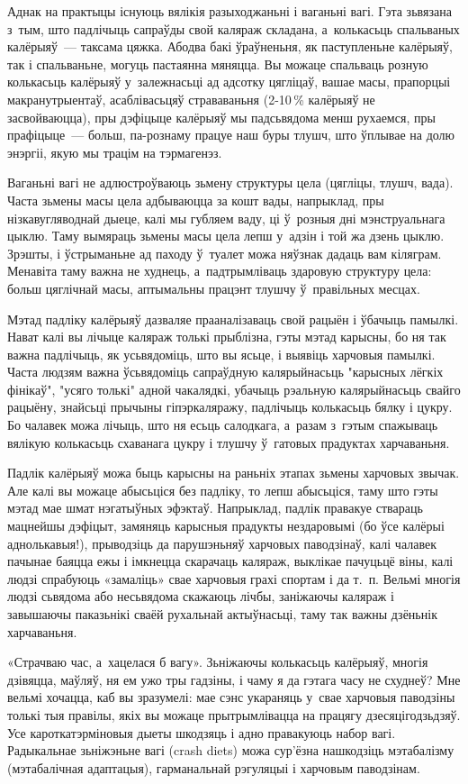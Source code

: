 Аднак на практыцы існуюць вялікія разыходжаньні і ваганьні вагі. Гэта зьвязана з~тым, што падлічыць сапраўды свой каляраж складана, а~колькасьць спальваных калёрыяў~--- таксама цяжка. Абодва бакі ўраўненьня, як паступленьне калёрыяў, так і спальваньне, могуць пастаянна мяняцца. Вы можаце спальваць розную колькасьць калёрыяў у~залежнасьці ад адсотку цягліцаў, вашае масы, прапорцыі макранутрыентаў, асаблівасьцяў страваваньня (2-10\,\% калёрыяў не засвойваюцца), пры дэфіцыце калёрыяў мы падсьвядома менш рухаемся, пры прафіцыце~--- больш, па-рознаму працуе наш буры тлушч, што ўплывае на долю энэргіі, якую мы трацім на тэрмагенэз.

Ваганьні вагі не адлюстроўваюць зьмену структуры цела (цягліцы, тлушч, вада). Часта зьмены масы цела адбываюцца за кошт вады, напрыклад, пры нізкавугляводнай дыеце, калі мы губляем ваду, ці ў~розныя дні мэнструальнага цыклю. Таму вымяраць зьмены масы цела лепш у~адзін і той жа дзень цыклю. Зрэшты, і ўстрыманьне ад паходу ў~туалет можа няўзнак дадаць вам кіляграм. Менавіта таму важна не худнець, а~падтрымліваць здаровую структуру цела: больш цяглічнай масы, аптымальны працэнт тлушчу ў~правільных месцах.

Мэтад падліку калёрыяў дазваляе прааналізаваць свой рацыён і ўбачыць памылкі. Нават калі вы лічыце каляраж толькі прыблізна, гэты мэтад карысны, бо ня так важна падлічыць, як усьвядоміць, што вы ясьце, і выявіць харчовыя памылкі. Часта людзям важна ўсьвядоміць сапраўдную калярыйнасьць "карысных лёгкіх фінікаў", "усяго толькі" адной чакалядкі, убачыць рэальную калярыйнасьць свайго рацыёну, знайсьці прычыны гіпэркаляражу, падлічыць колькасьць бялку і цукру. Бо чалавек можа лічыць, што ня есьць салодкага, а~разам з~гэтым спажываць вялікую колькасьць схаванага цукру і тлушчу ў~гатовых прадуктах харчаваньня.

Падлік калёрыяў можа быць карысны на раньніх этапах зьмены харчовых звычак. Але калі вы можаце абысьціся без падліку, то лепш абысьціся, таму што гэты мэтад мае шмат нэгатыўных эфэктаў. Напрыклад, падлік правакуе ствараць мацнейшы дэфіцыт, замяняць карысныя прадукты нездаровымі (бо ўсе калёрыі аднолькавыя!), прыводзіць да парушэньняў харчовых паводзінаў, калі чалавек пачынае баяцца ежы і імкнецца скарачаць каляраж, выклікае пачуцьцё віны, калі людзі спрабуюць «замаліць» свае харчовыя грахі спортам і да т.~п. Вельмі многія людзі сьвядома або несьвядома скажаюць лічбы, заніжаючы каляраж і завышаючы паказьнікі сваёй рухальнай актыўнасьці, таму так важны дзёньнік харчаваньня.

«Страчваю час, а~хацелася б вагу». Зьніжаючы колькасьць калёрыяў, многія дзівяцца, маўляў, ня ем ужо тры гадзіны, і чаму я да гэтага часу не схуднеў? Мне вельмі хочацца, каб вы зразумелі: мае сэнс укараняць у~свае харчовыя паводзіны толькі тыя правілы, якіх вы можаце прытрымлівацца на працягу дзесяцігодзьдзяў. Усе кароткатэрміновыя дыеты шкодзяць і адно правакуюць набор вагі. Радыкальнае зьніжэньне вагі (crash diets) можа сур'ёзна нашкодзіць мэтабалізму (мэтабалічная адаптацыя), гарманальнай рэгуляцыі і харчовым паводзінам.

